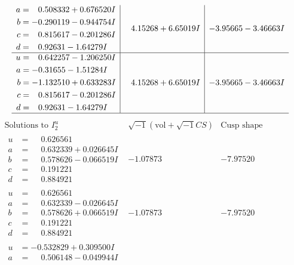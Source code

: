 \documentclass[1p]{elsarticle_modified}
\theoremstyle{definition}
\newcommand{\I}{\sqrt{-1}}
\begin{document}
$$\begin{array}{c|c|c}
\begin{aligned}
a &= \phantom{-}0.508332 + 0.676520 I \\
b &= -0.290119 - 0.944754 I \\
c &= \phantom{-}0.815617 - 0.201286 I \\
d &= \phantom{-}0.92631 - 1.64279 I\end{aligned}
 & \phantom{-}4.15268 + 6.65019 I & -3.95665 - 3.46663 I \\ \hline\begin{aligned}
u &= \phantom{-}0.642257 - 1.206250 I \\
a &= -0.31655 - 1.51284 I \\
b &= -1.132510 + 0.633283 I \\
c &= \phantom{-}0.815617 - 0.201286 I \\
d &= \phantom{-}0.92631 - 1.64279 I\end{aligned}
 & \phantom{-}4.15268 + 6.65019 I & -3.95665 - 3.46663 I\\
 \hline 
 \end{array}$$\newpage$$\begin{array}{c|c|c}  
\text{Solutions to }I^u_{2}& \I (\text{vol} + \sqrt{-1}CS) & \text{Cusp shape}\\
 \hline 
\begin{aligned}
u &= \phantom{-}0.626561\phantom{ +0.000000I} \\
a &= \phantom{-}0.632339 + 0.026645 I \\
b &= \phantom{-}0.578626 - 0.066519 I \\
c &= \phantom{-}0.191221\phantom{ +0.000000I} \\
d &= \phantom{-}0.884921\phantom{ +0.000000I}\end{aligned}
 & -1.07873\phantom{ +0.000000I} & -7.97520\phantom{ +0.000000I} \\ \hline\begin{aligned}
u &= \phantom{-}0.626561\phantom{ +0.000000I} \\
a &= \phantom{-}0.632339 - 0.026645 I \\
b &= \phantom{-}0.578626 + 0.066519 I \\
c &= \phantom{-}0.191221\phantom{ +0.000000I} \\
d &= \phantom{-}0.884921\phantom{ +0.000000I}\end{aligned}
 & -1.07873\phantom{ +0.000000I} & -7.97520\phantom{ +0.000000I} \\ \hline\begin{aligned}
u &= -0.532829 + 0.309500 I \\
a &= \phantom{-}0.506148 - 0.049944 I \\

\end{aligned}
\end{array}$$
\end{document}
